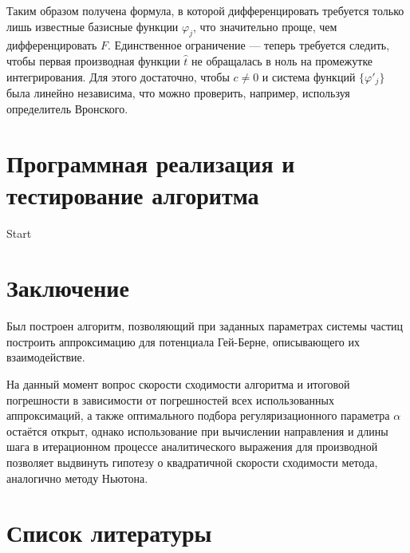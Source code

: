 \documentclass[a4paper,14pt]{extarticle}
\begin{document}
    Таким образом получена формула, в которой дифференцировать требуется только лишь известные базисные функции $\varphi_j$, что значительно проще, чем дифференцировать $F$. Единственное ограничение --- теперь требуется следить, чтобы первая производная функции $\hat{t}$ не обращалась в ноль на промежутке интегрирования. Для этого достаточно, чтобы $c \neq 0$ и система функций $\{\varphi'_j \}$ была линейно независима, что можно проверить, например, используя определитель Вронского.

    \newpage

    \section{Программная реализация и тестирование алгоритма}

    Start

    \newpage

    \section*{Заключение}

    Был построен алгоритм, позволяющий при заданных параметрах системы частиц построить аппроксимацию для потенциала Гей-Берне, описывающего их взаимодействие.

    На данный момент вопрос скорости сходимости алгоритма и итоговой погрешности в зависимости от погрешностей всех использованных аппроксимаций, а также оптимального подбора регуляризационного параметра $\alpha$ остаётся открыт, однако использование при вычислении направления и длины шага в итерационном процессе аналитического выражения для производной позволяет выдвинуть гипотезу о квадратичной скорости сходимости метода, аналогично методу Ньютона.

    \newpage

    \section*{Список литературы}
\end{document}
